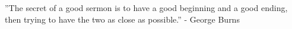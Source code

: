 ''The secret of a good sermon is to have a good beginning and a good ending, then trying to have the two as close as possible.'' - George Burns
